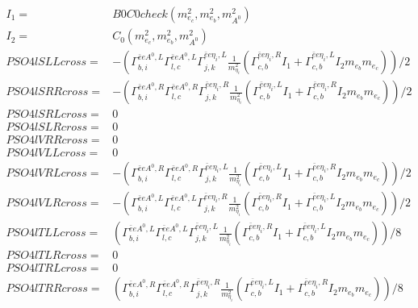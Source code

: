 \documentclass[A4,landscape]{article}
\begin{document}
\begin{align} 
I_1= & B0C0check(m^2_{e_{{c}}}, m^2_{e_{{b}}}, m^2_{A^0}) \\ 
I_2= & C_0(m^2_{e_{{c}}}, m^2_{e_{{b}}}, m^2_{A^0}) \\ 
  PSO4lSLLcross= & -( \Gamma^{\bar{e}e A^0 ,L}_{b, i} \Gamma^{\bar{e}e A^0 ,L}_{l, c} \Gamma^{\bar{e}e \eta_i ,L}_{j, k} \frac{1}{m^2_{\eta_i}} (\Gamma^{\bar{e}e \eta_i ,R}_{c, b} I_1 + \Gamma^{\bar{e}e \eta_i ,L}_{c, b} I_2 m_{e_{{b}}} m_{e_{{c}}}))/2 \\ 
  PSO4lSRRcross= & -( \Gamma^{\bar{e}e A^0 ,R}_{b, i} \Gamma^{\bar{e}e A^0 ,R}_{l, c} \Gamma^{\bar{e}e \eta_i ,R}_{j, k} \frac{1}{m^2_{\eta_i}} (\Gamma^{\bar{e}e \eta_i ,L}_{c, b} I_1 + \Gamma^{\bar{e}e \eta_i ,R}_{c, b} I_2 m_{e_{{b}}} m_{e_{{c}}}))/2 \\ 
  PSO4lSRLcross= & 0 \\ 
  PSO4lSLRcross= & 0 \\ 
  PSO4lVRRcross= & 0 \\ 
  PSO4lVLLcross= & 0 \\ 
  PSO4lVRLcross= & -( \Gamma^{\bar{e}e A^0 ,R}_{b, i} \Gamma^{\bar{e}e A^0 ,R}_{l, c} \Gamma^{\bar{e}e \eta_i ,L}_{j, k} \frac{1}{m^2_{\eta_i}} (\Gamma^{\bar{e}e \eta_i ,L}_{c, b} I_1 + \Gamma^{\bar{e}e \eta_i ,R}_{c, b} I_2 m_{e_{{b}}} m_{e_{{c}}}))/2 \\ 
  PSO4lVLRcross= & -( \Gamma^{\bar{e}e A^0 ,L}_{b, i} \Gamma^{\bar{e}e A^0 ,L}_{l, c} \Gamma^{\bar{e}e \eta_i ,R}_{j, k} \frac{1}{m^2_{\eta_i}} (\Gamma^{\bar{e}e \eta_i ,R}_{c, b} I_1 + \Gamma^{\bar{e}e \eta_i ,L}_{c, b} I_2 m_{e_{{b}}} m_{e_{{c}}}))/2 \\ 
  PSO4lTLLcross= & ( \Gamma^{\bar{e}e A^0 ,L}_{b, i} \Gamma^{\bar{e}e A^0 ,L}_{l, c} \Gamma^{\bar{e}e \eta_i ,L}_{j, k} \frac{1}{m^2_{\eta_i}} (\Gamma^{\bar{e}e \eta_i ,R}_{c, b} I_1 + \Gamma^{\bar{e}e \eta_i ,L}_{c, b} I_2 m_{e_{{b}}} m_{e_{{c}}}))/8 \\ 
  PSO4lTLRcross= & 0 \\ 
  PSO4lTRLcross= & 0 \\ 
  PSO4lTRRcross= & ( \Gamma^{\bar{e}e A^0 ,R}_{b, i} \Gamma^{\bar{e}e A^0 ,R}_{l, c} \Gamma^{\bar{e}e \eta_i ,R}_{j, k} \frac{1}{m^2_{\eta_i}} (\Gamma^{\bar{e}e \eta_i ,L}_{c, b} I_1 + \Gamma^{\bar{e}e \eta_i ,R}_{c, b} I_2 m_{e_{{b}}} m_{e_{{c}}}))/8 \\ 
\end{align} 
\end{document}
